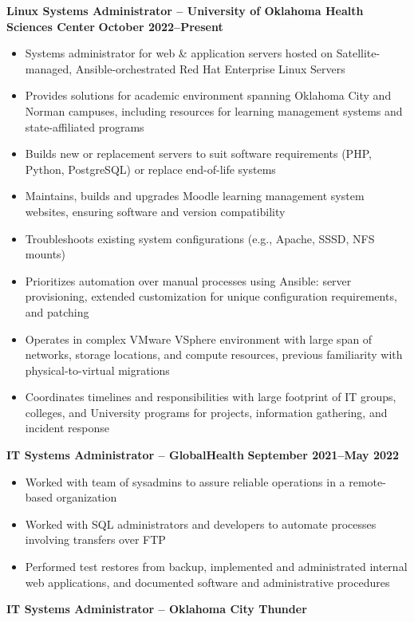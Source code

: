\documentclass[line]{res}
\begin{document}
\begin{resume}
\textbf{Linux Systems Administrator -- University of Oklahoma Health Sciences Center}
\newline
\textbf{October 2022--Present}
	\begin{itemize}
		\item Systems administrator for web \& application servers hosted on Satellite-managed, Ansible-orchestrated Red Hat Enterprise Linux Servers
		\item Provides solutions for academic environment spanning Oklahoma City and Norman campuses, including resources for learning management systems and state-affiliated programs
		\item Builds new or replacement servers to suit software requirements (PHP, Python, PostgreSQL) or replace end-of-life systems
		\item Maintains, builds and upgrades Moodle learning management system websites, ensuring software and version compatibility
		\item Troubleshoots existing system configurations (e.g., Apache, SSSD, NFS mounts)
		\item Prioritizes automation over manual processes using Ansible: server provisioning, extended customization for unique configuration requirements, and patching
		\item Operates in complex VMware VSphere environment with large span of networks, storage locations, and compute resources, previous familiarity with physical-to-virtual migrations
		\item Coordinates timelines and responsibilities with large footprint of IT groups, colleges, and University programs for projects, information gathering, and incident response
	\end{itemize}
\textbf{IT Systems Administrator -- GlobalHealth}
\newline
\textbf{September 2021--May 2022}
	\begin{itemize}
		\item Worked with team of sysadmins to assure reliable operations in a remote-based organization
		\item Worked with SQL administrators and developers to automate processes involving transfers over FTP
		\item Performed test restores from backup, implemented and administrated internal web applications, and documented software and administrative procedures
	\end{itemize}
\textbf{IT Systems Administrator -- Oklahoma City Thunder}
\newline

\end{resume}
\end{document}
